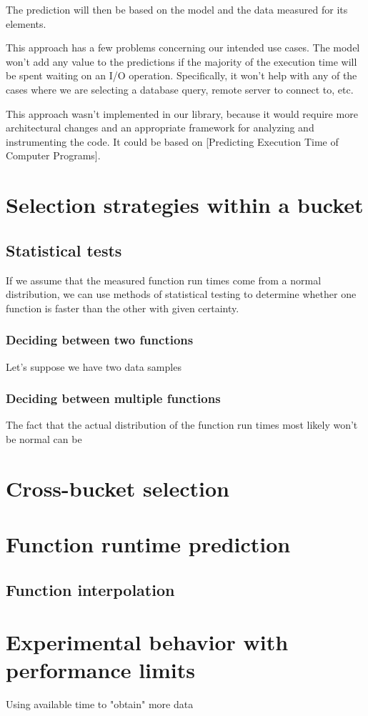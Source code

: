 The prediction will then be based on the model and the data measured for its elements.

This approach has a few problems concerning our intended use cases. The model won't add any value to the predictions if the majority of the execution time will be spent waiting on an I/O operation. Specifically, it won't help with any of the cases where we are selecting a database query, remote server to connect to, etc.

This approach wasn't implemented in our library, because it would require more architectural changes and an appropriate framework for analyzing and instrumenting the code. It could be based on [Predicting Execution Time of Computer Programs].

\section{Selection strategies within a bucket}

\subsection{Statistical tests}

If we assume that the measured function run times come from a normal distribution, we can use methods of statistical testing to determine whether one function is faster than the other with given certainty. 

\subsubsection{Deciding between two functions}

Let's suppose we have two data samples 

\subsubsection{Deciding between multiple functions}


The fact that the actual distribution of the function run times most likely won't be normal can be 

\section{Cross-bucket selection}

\section{Function runtime prediction}

\subsection{Function interpolation}

\section{Experimental behavior with performance limits}
Using available time to "obtain" more data

